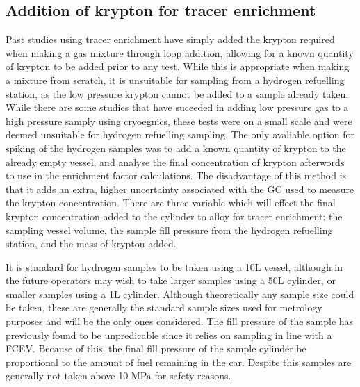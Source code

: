 \subsection{Addition of krypton for tracer enrichment}
Past studies using tracer enrichment have simply added the krypton required when making a gas mixture through loop addition,\cite{Murugan2014} allowing for a known quantity of krypton to be added prior to any test. While this is appropriate when making a mixture from scratch, it is unsuitable for sampling from a hydrogen refuelling station, as the low pressure krypton cannot be added to a sample already taken. While there are some studies that have suceeded in adding low pressure gas to a high pressure samply using cryoegnics,\cite{Podesta2017} these tests were on a small scale and were deemed unsuitable for hydrogen refuelling sampling. The only avaliable option for spiking of the hydrogen samples was to add a known quantity of krypton to the already empty vessel, and analyse the final concentration of krypton afterwords to use in the enrichment factor calculations. The disadvantage of this method is that it adds an extra, higher uncertainty associated with the GC used to measure the krypton concentration. There are three variable which will effect the final krypton concentration added to the cylinder to alloy for tracer enrichment; the sampling vessel volume, the sample fill pressure from the hydrogen refuelling station, and the mass of krypton added.  

It is standard for hydrogen samples to be taken using a 10L vessel, although in the future operators may wish to take larger samples using a 50L cylinder, or smaller samples using a 1L cylinder. Although theoretically any sample size could be taken, these are generally the standard sample sizes used for metrology purposes and will be the only ones considered. The fill pressure of the sample has previously found to be unpredicable since it relies on sampling in line with a FCEV. Because of this, the final fill pressure of the sample cylinder be proportional to the amount of fuel remaining in the car. Despite this samples are generally not taken above 10 MPa for safety reasons. 

